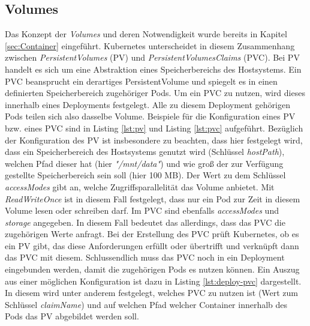 \documentclass[11pt,a4paper]{article}
\begin{document}
\subsection{Volumes}
Das Konzept der \emph{Volumes} und deren Notwendigkeit wurde bereits in Kapitel \ref{sec:Container} eingeführt.
Kubernetes unterscheidet in diesem Zusammenhang zwischen \emph{PersistentVolumes} (PV) und \emph{PersistentVolumesClaims} (PVC).
Bei PV handelt es sich um eine Abstraktion eines Speicherbereichs des Hostsystems.
Ein PVC beansprucht ein derartiges PersistentVolume und spiegelt es in einen
definierten Speicherbereich zugehöriger Pods. Um ein PVC zu nutzen, wird dieses innerhalb eines Deployments festgelegt.
Alle zu diesem Deployment gehörigen Pods teilen sich also dasselbe Volume.
Beispiele für die Konfiguration eines PV bzw. eines PVC sind in Listing \ref{lst:pv} und Listing \ref{lst:pvc}
aufgeführt. Bezüglich der Konfiguration des PV ist insbesondere zu beachten, dass hier
festgelegt wird, dass ein Speicherbereich des Hostsystems genutzt wird (Schlüssel \emph{hostPath}),
welchen Pfad dieser hat (hier \emph{"/mnt/data"})
und wie groß der zur Verfügung gestellte Speicherbereich sein soll (hier 100 MB).
Der Wert zu dem Schlüssel \emph{accessModes} gibt an, welche Zugriffsparallelität das Volume anbietet.
Mit \emph{ReadWriteOnce} ist in diesem Fall festgelegt, dass nur ein Pod zur Zeit
in diesem Volume lesen oder schreiben darf.
Im PVC sind ebenfalls \emph{accessModes} und \emph{storage} angegeben. In diesem Fall
bedeutet das allerdings, dass das PVC die zugehörigen Werte anfragt.
Bei der Erstellung des PVC prüft Kubernetes, ob es ein PV gibt,
das diese Anforderungen erfüllt oder übertrifft und verknüpft dann das PVC mit diesem.
Schlussendlich muss das PVC noch in ein Deployment eingebunden werden, damit die zugehörigen
Pods es nutzen können. Ein Auszug aus einer möglichen Konfiguration ist dazu in
Listing \ref{lst:deploy-pvc} dargestellt. In diesem wird unter anderem festgelegt,
welches PVC zu nutzen ist (Wert zum Schlüssel \emph{claimName}) und auf welchen Pfad
welcher Container innerhalb des Pods das PV abgebildet werden soll.




\end{document}
